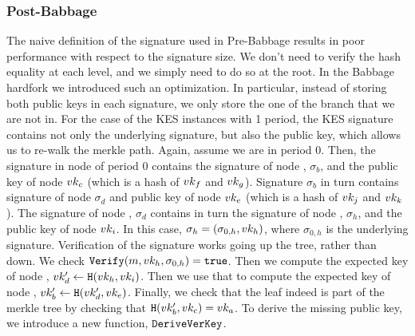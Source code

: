 \subsubsection{Post-Babbage}
The naive definition of the
signature used in Pre-Babbage results in poor performance with respect to the signature size. We
don't need to verify the hash equality at each level, and we simply need to do so at the root. In the Babbage
hardfork we introduced such an optimization. In particular, instead of storing both public keys in each signature, we
only store the one of the branch that we are not in. For the case of the KES instances with 1 period, the KES signature
contains not only the underlying signature, but also the public key, which allows us to re-walk the merkle path.
Again, assume we are in period 0. Then, the signature in node
 of period 0 contains the signature of node , $\sigma_b$, and the public key of node
 $vk_c$ (which is a hash of $vk_f$ and $vk_g$). Signature $\sigma_b$ in turn contains signature of
node  $\sigma_d$ and public key of node  $vk_e$ (which is a hash of $vk_j$ and $vk_k$).
The signature of node , $\sigma_d$ contains in turn the signature of node , $\sigma_h$, and the
public key of node  $vk_i$. In this case, $\sigma_h = (\sigma_{0, h}, vk_h)$, where $\sigma_{0, h}$ is
the underlying signature. Verification of the signature
works going up the tree, rather than down. We check $\texttt{Verify}(m, vk_h, \sigma_{0, h}) = \texttt{true}$. Then we compute the
expected key of node , $vk_d'\gets\texttt{H}(vk_h, vk_i)$. Then we use that to compute the expected key of node
, $vk_b'\gets\texttt{H}(vk_d', vk_e)$. Finally, we check that the leaf indeed is part of the merkle tree by
checking that $\texttt{H}(vk_b', vk_c) = vk_a$. To derive the missing public key, we introduce a new function, $\texttt{DeriveVerKey}$.

